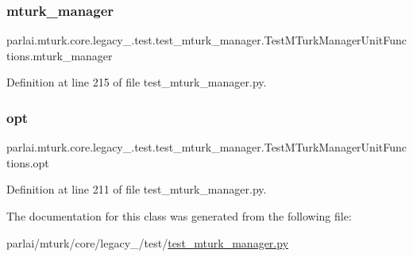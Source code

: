 \subsubsection{\texorpdfstring{mturk\+\_\+manager}{mturk\_manager}}
{\footnotesize\ttfamily parlai.\+mturk.\+core.\+legacy\+\_.\+test.\+test\+\_\+mturk\+\_\+manager.\+Test\+M\+Turk\+Manager\+Unit\+Functions.\+mturk\+\_\+manager}



Definition at line 215 of file test\+\_\+mturk\+\_\+manager.\+py.

\mbox{\label{classparlai_1_1mturk_1_1core_1_1legacy__2018_1_1test_1_1test__mturk__manager_1_1TestMTurkManagerUnitFunctions_ae7e67ea04b31ae41cb9fc1cc72da1828}} 
\subsubsection{\texorpdfstring{opt}{opt}}
{\footnotesize\ttfamily parlai.\+mturk.\+core.\+legacy\+\_.\+test.\+test\+\_\+mturk\+\_\+manager.\+Test\+M\+Turk\+Manager\+Unit\+Functions.\+opt}



Definition at line 211 of file test\+\_\+mturk\+\_\+manager.\+py.



The documentation for this class was generated from the following file\+:\begin{DoxyCompactItemize}
\item 
parlai/mturk/core/legacy\+\_/test/\hyperlink{legacy__2018_2test_2test__mturk__manager_8py}{test\+\_\+mturk\+\_\+manager.\+py}\end{DoxyCompactItemize}
